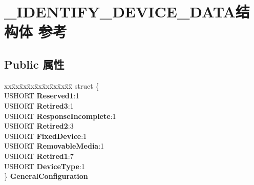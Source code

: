 \hypertarget{struct___i_d_e_n_t_i_f_y___d_e_v_i_c_e___d_a_t_a}{}\section{\+\_\+\+I\+D\+E\+N\+T\+I\+F\+Y\+\_\+\+D\+E\+V\+I\+C\+E\+\_\+\+D\+A\+T\+A结构体 参考}
\label{struct___i_d_e_n_t_i_f_y___d_e_v_i_c_e___d_a_t_a}
\subsection*{Public 属性}
\begin{DoxyCompactItemize}
\item 
\mbox{\label{struct___i_d_e_n_t_i_f_y___d_e_v_i_c_e___d_a_t_a_a4a969f544f904bb336846f24291313c2}} 
\begin{tabbing}
xx\=xx\=xx\=xx\=xx\=xx\=xx\=xx\=xx\=\kill
struct \{\\
\>USHORT {\bfseries Reserved1}:1\\
\>USHORT {\bfseries Retired3}:1\\
\>USHORT {\bfseries ResponseIncomplete}:1\\
\>USHORT {\bfseries Retired2}:3\\
\>USHORT {\bfseries FixedDevice}:1\\
\>USHORT {\bfseries RemovableMedia}:1\\
\>USHORT {\bfseries Retired1}:7\\
\>USHORT {\bfseries DeviceType}:1\\
\} {\bfseries GeneralConfiguration}\\


\end{tabbing}
\end{DoxyCompactItemize}
